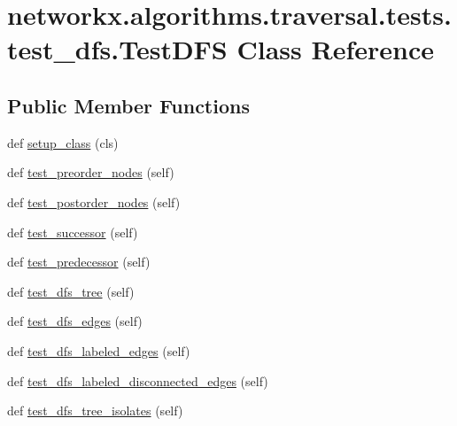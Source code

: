 \hypertarget{classnetworkx_1_1algorithms_1_1traversal_1_1tests_1_1test__dfs_1_1TestDFS}{}\section{networkx.\+algorithms.\+traversal.\+tests.\+test\+\_\+dfs.\+Test\+D\+FS Class Reference}
\label{classnetworkx_1_1algorithms_1_1traversal_1_1tests_1_1test__dfs_1_1TestDFS}
\subsection*{Public Member Functions}
\begin{DoxyCompactItemize}
\item 
def \hyperlink{classnetworkx_1_1algorithms_1_1traversal_1_1tests_1_1test__dfs_1_1TestDFS_aa4604493268b7efab2382e4cdf8932b6}{setup\+\_\+class} (cls)
\item 
def \hyperlink{classnetworkx_1_1algorithms_1_1traversal_1_1tests_1_1test__dfs_1_1TestDFS_afe8780fe7b8cd911b584ca3281413153}{test\+\_\+preorder\+\_\+nodes} (self)
\item 
def \hyperlink{classnetworkx_1_1algorithms_1_1traversal_1_1tests_1_1test__dfs_1_1TestDFS_a369bd40746e884c63acd1f6258a2b820}{test\+\_\+postorder\+\_\+nodes} (self)
\item 
def \hyperlink{classnetworkx_1_1algorithms_1_1traversal_1_1tests_1_1test__dfs_1_1TestDFS_abca07b49292631b174c990ac2f0dd497}{test\+\_\+successor} (self)
\item 
def \hyperlink{classnetworkx_1_1algorithms_1_1traversal_1_1tests_1_1test__dfs_1_1TestDFS_a46241eb6d5cf6422f6f0d957c6dcc068}{test\+\_\+predecessor} (self)
\item 
def \hyperlink{classnetworkx_1_1algorithms_1_1traversal_1_1tests_1_1test__dfs_1_1TestDFS_a3ced0fc2636b1d04e1395cbe6b8724ac}{test\+\_\+dfs\+\_\+tree} (self)
\item 
def \hyperlink{classnetworkx_1_1algorithms_1_1traversal_1_1tests_1_1test__dfs_1_1TestDFS_a11d4c2e3458fa9f941d2e335d385e456}{test\+\_\+dfs\+\_\+edges} (self)
\item 
def \hyperlink{classnetworkx_1_1algorithms_1_1traversal_1_1tests_1_1test__dfs_1_1TestDFS_aa73d06841031022dcb3e6f0364569d83}{test\+\_\+dfs\+\_\+labeled\+\_\+edges} (self)
\item 
def \hyperlink{classnetworkx_1_1algorithms_1_1traversal_1_1tests_1_1test__dfs_1_1TestDFS_a4dabf8805cc7393337c1910cf34e4f71}{test\+\_\+dfs\+\_\+labeled\+\_\+disconnected\+\_\+edges} (self)
\item 
def \hyperlink{classnetworkx_1_1algorithms_1_1traversal_1_1tests_1_1test__dfs_1_1TestDFS_a4231726d5e92c694728b22286e897d43}{test\+\_\+dfs\+\_\+tree\+\_\+isolates} (self)
\end{DoxyCompactItemize}
